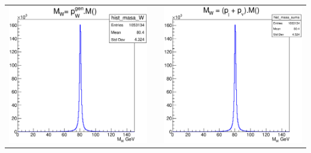 \documentclass[10pt]{beamer}
\begin{document}
\begin{frame}
\begin{center}
\begin{tabular}{ccc}

	\includegraphics[scale=0.18]{plot-gen-mw.eps} &&

	\includegraphics[scale=0.18]{plot-mw-reco.eps} \\


\end{tabular}
\end{center}
\end{frame}
\end{document}

